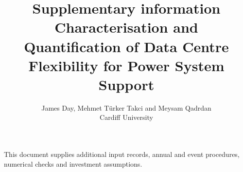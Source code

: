 \documentclass[11pt,a4paper]{article}
\title{Supplementary information\\\large Characterisation and Quantification of Data Centre Flexibility for Power System Support}
\author{James Day, Mehmet T\"urker Takci and Meysam Qadrdan\\Cardiff University}
\date{}
\begin{document}
\raggedbottom
\maketitle
\noindent This document supplies additional input records, annual and event procedures, numerical checks and investment assumptions.





\end{document}
